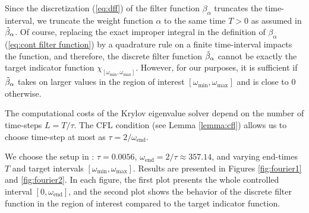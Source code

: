 \documentclass[a4paper,11pt,bibliography=totoc,listof=totoc,headinclude=true,cleardoublepage=empty,oneside]{scrbook}
\newcommand{\dff}{\Tilde{\beta}_\alpha}
\newcommand{\e}{\mathrm{end}}
\renewcommand{\eqref}[1]{(\ref{#1})}
\begin{document}
Since the discretization \eqref{eq:dff} of the filter function $\beta_\alpha$ truncates the time-interval, we truncate the weight function $\alpha$ to the same time $T>0$ as assumed in $\dff$. Of course, replacing the exact improper integral in the definition of $\beta_\alpha$ \eqref{eq:cont filter function} by a quadrature rule on a finite time-interval impacts the function, and therefore, the discrete filter function $\dff$ cannot be exactly the target indicator function $\chi_{\left[\omega_{\min}, \omega_{\max}\right]}$. However, for our purposes, it is sufficient if $\dff$ takes on larger values in the region of interest $\left[\omega_{\min}, \omega_{\max}\right]$ and is close to 0 otherwise.

The computational costs of the Krylov eigenvalue solver depend on the number of time-steps $L=T/\tau$. The CFL condition (see Lemma \ref{lemma:cfl}) allows us to choose time-step at most as $\tau = 2/\omega_{\e}$.

We choose the setup in \cite[section 3.1.2]{nannen}: $\tau = 0.0056$, $\omega_\e = 2/\tau \approx 357.14$, and varying end-times $T$ and target intervals $\left[\omega_{\min}, \omega_{\max}\right]$. Results are presented in Figures \ref{fig:fourier1} and \ref{fig:fourier2}. In each figure, the first plot presents the whole controlled interval $\left[0, \omega_\e\right]$, and the second plot shows the behavior of the discrete filter function in the region of interest compared to the target indicator function.
\end{document}
